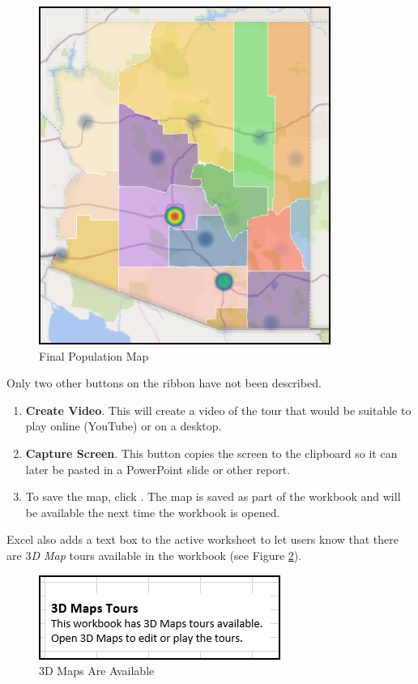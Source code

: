 \begin{figure}[H]
	\centering
	\includegraphics[width=\maxwidth{.50\linewidth}]{gfx/ch08_fig29}
	\caption{Final Population Map}
	\label{08:fig29}
\end{figure}

Only two other buttons on the ribbon have not been described.

\begin{enumbox}
	\begin{enumerate}
		\item \textbf{Create Video}. This will create a video of the tour that would be suitable to play online (YouTube) or on a desktop.
		\item \textbf{Capture Screen}. This button copies the screen to the clipboard so it can later be pasted in a PowerPoint slide or other report.
		\item To save the map, click . The map is saved as part of the workbook and will be available the next time the workbook is opened. 
	\end{enumerate}
\end{enumbox}

Excel also adds a text box to the active worksheet to let users know that there are \textit{$ 3 $D Map} tours available in the workbook (see Figure \ref{08:fig30}).

\begin{figure}[H]
	\centering
	\includegraphics[width=\maxwidth{.65\linewidth}]{gfx/ch08_fig30}
	\caption{$ 3 $D Maps Are Available}
	\label{08:fig30}
\end{figure}


